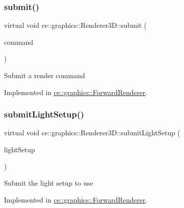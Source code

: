 \subsubsection{\texorpdfstring{submit()}{submit()}}
{\footnotesize\ttfamily virtual void ce\+::graphics\+::\+Renderer3\+D\+::submit (\begin{DoxyParamCaption}\item[{const \hyperlink{structce_1_1graphics_1_1_render_command}{Render\+Command} \&}]{command }\end{DoxyParamCaption})\hspace{0.3cm}{\ttfamily [pure virtual]}}

Submit a render command 

Implemented in \hyperlink{classce_1_1graphics_1_1_forward_renderer_a3fb15f85368a78834b9d25b98461916c}{ce\+::graphics\+::\+Forward\+Renderer}.

\mbox{\label{classce_1_1graphics_1_1_renderer3_d_a4a2eb6efe3adbff611c20141159eb3dc}} 
\subsubsection{\texorpdfstring{submit\+Light\+Setup()}{submitLightSetup()}}
{\footnotesize\ttfamily virtual void ce\+::graphics\+::\+Renderer3\+D\+::submit\+Light\+Setup (\begin{DoxyParamCaption}\item[{const \hyperlink{structce_1_1graphics_1_1_light_setup}{Light\+Setup} \&}]{light\+Setup }\end{DoxyParamCaption})\hspace{0.3cm}{\ttfamily [pure virtual]}}

Submit the light setup to use 

Implemented in \hyperlink{classce_1_1graphics_1_1_forward_renderer_a32c92d13c2ba951f71552ea9cf15350c}{ce\+::graphics\+::\+Forward\+Renderer}.

\mbox{\label{classce_1_1graphics_1_1_renderer3_d_aba7b0abfa0aad0d89a816923e83ef787}} 
